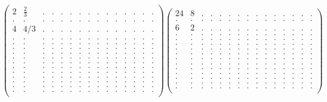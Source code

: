 \documentclass[12pt,a4paper]{amsart}
\begin{document}
\begin{align*}
\left(\begin{array}{rrrrrrrrrrrrrrr}%
2&\frac23&.&.&.&.&.&.&.&.&.&.&.&.&.\\%
.&.&.&.&.&.&.&.&.&.&.&.&.&.&.\\%
4&4/3&.&.&.&.&.&.&.&.&.&.&.&.&.\\%
.&.&.&.&.&.&.&.&.&.&.&.&.&.&.\\%
.&.&.&.&.&.&.&.&.&.&.&.&.&.&.\\%
.&.&.&.&.&.&.&.&.&.&.&.&.&.&.\\%
.&.&.&.&.&.&.&.&.&.&.&.&.&.&.\\%
.&.&.&.&.&.&.&.&.&.&.&.&.&.&.\\%
.&.&.&.&.&.&.&.&.&.&.&.&.&.&.\\%
.&.&.&.&.&.&.&.&.&.&.&.&.&.&.\\%
.&.&.&.&.&.&.&.&.&.&.&.&.&.&.\\%
.&.&.&.&.&.&.&.&.&.&.&.&.&.&.\\%
.&.&.&.&.&.&.&.&.&.&.&.&.&.&.\\%
.&.&.&.&.&.&.&.&.&.&.&.&.&.&.\\%
.&.&.&.&.&.&.&.&.&.&.&.&.&.&.\\%
\end{array}\right)%
\left(\begin{array}{rrrrrrrrrrrrrrr}%
24&8&.&.&.&.&.&.&.&.&.&.&.&.&.\\%
.&.&.&.&.&.&.&.&.&.&.&.&.&.&.\\%
6&2&.&.&.&.&.&.&.&.&.&.&.&.&.\\%
.&.&.&.&.&.&.&.&.&.&.&.&.&.&.\\%
.&.&.&.&.&.&.&.&.&.&.&.&.&.&.\\%
.&.&.&.&.&.&.&.&.&.&.&.&.&.&.\\%
.&.&.&.&.&.&.&.&.&.&.&.&.&.&.\\%
.&.&.&.&.&.&.&.&.&.&.&.&.&.&.\\%
.&.&.&.&.&.&.&.&.&.&.&.&.&.&.\\%
.&.&.&.&.&.&.&.&.&.&.&.&.&.&.\\%
.&.&.&.&.&.&.&.&.&.&.&.&.&.&.\\%
.&.&.&.&.&.&.&.&.&.&.&.&.&.&.\\%
.&.&.&.&.&.&.&.&.&.&.&.&.&.&.\\%
.&.&.&.&.&.&.&.&.&.&.&.&.&.&.\\%
.&.&.&.&.&.&.&.&.&.&.&.&.&.&.\\%
\end{array}\right)%
\end{align*}
\end{document}
